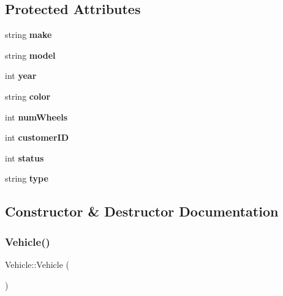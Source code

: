 \subsection*{Protected Attributes}
\begin{DoxyCompactItemize}
\item 
\mbox{\label{class_vehicle_a0f9767be0624891a5416e4734bc90424}} 
string {\bfseries make}
\item 
\mbox{\label{class_vehicle_a61799a3b07bd7ad2a07d61af510f91f0}} 
string {\bfseries model}
\item 
\mbox{\label{class_vehicle_ad612fe1e00e266a5d740bb67920211d4}} 
int {\bfseries year}
\item 
\mbox{\label{class_vehicle_a992c801eab239e432add59c3a8ce5d7e}} 
string {\bfseries color}
\item 
\mbox{\label{class_vehicle_a08e3dd6521f07827a8c0e6c509f61b7c}} 
int {\bfseries num\+Wheels}
\item 
\mbox{\label{class_vehicle_af4ac7afd3bab1519a1b5f247c44bde5b}} 
int {\bfseries customer\+ID}
\item 
\mbox{\label{class_vehicle_a684a4340e817cdefcde3b0d9d1b98f4c}} 
int {\bfseries status}
\item 
\mbox{\label{class_vehicle_a99487b9f05bb36855d7af79df4f60781}} 
string {\bfseries type}
\end{DoxyCompactItemize}


\subsection{Constructor \& Destructor Documentation}
\mbox{\label{class_vehicle_abaad8187d9f2ede4fb8ea18de0a6764c}} 
\subsubsection{\texorpdfstring{Vehicle()}{Vehicle()}\hspace{0.1cm}{\footnotesize\ttfamily [1/2]}}
{\footnotesize\ttfamily Vehicle\+::\+Vehicle (\begin{DoxyParamCaption}{ }\end{DoxyParamCaption})}

